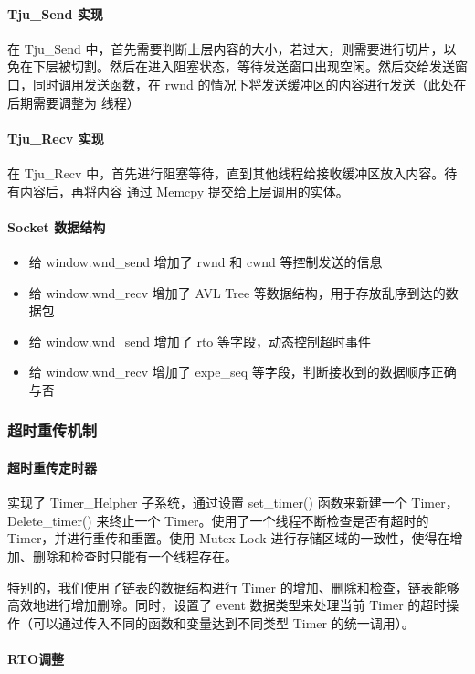 \paragraph*{Tju\_Send 实现} 在 Tju\_Send 中，首先需要判断上层内容的大小，若过大，则需要进行切片，以免在下层被切割。然后在进入阻塞状态，等待发送窗口出现空闲。然后交给发送窗口，同时调用发送函数，在 rwnd 的情况下将发送缓冲区的内容进行发送（此处在后期需要调整为 线程）

\paragraph*{Tju\_Recv 实现} 在 Tju\_Recv 中，首先进行阻塞等待，直到其他线程给接收缓冲区放入内容。待有内容后，再将内容 通过 Memcpy 提交给上层调用的实体。

\paragraph*{Socket 数据结构}
\begin{itemize}
    \item 给 window.wnd\_send 增加了 rwnd 和 cwnd 等控制发送的信息
    \item 给 window.wnd\_recv 增加了 AVL Tree 等数据结构，用于存放乱序到达的数据包
    \item 给 window.wnd\_send 增加了 rto 等字段，动态控制超时事件
    \item 给 window.wnd\_recv 增加了 expe\_seq 等字段，判断接收到的数据顺序正确与否
\end{itemize}

\subsubsection*{超时重传机制}

\paragraph*{超时重传定时器}
实现了 Timer\_Helpher 子系统，通过设置 set\_timer() 函数来新建一个 Timer，Delete\_timer() 来终止一个 Timer。使用了一个线程不断检查是否有超时的Timer，并进行重传和重置。使用 Mutex Lock 进行存储区域的一致性，使得在增加、删除和检查时只能有一个线程存在。

特别的，我们使用了链表的数据结构进行 Timer 的增加、删除和检查，链表能够高效地进行增加删除。同时，设置了 event 数据类型来处理当前 Timer 的超时操作（可以通过传入不同的函数和变量达到不同类型 Timer 的统一调用）。

\paragraph*{RTO调整}

